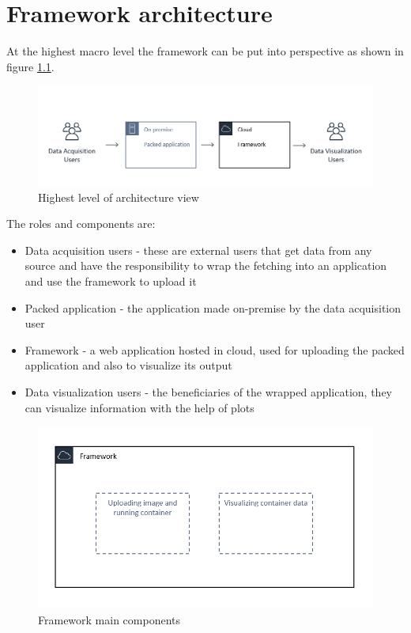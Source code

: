 \chapter{Framework architecture}
\label{chap:03}

At the highest macro level the framework can be put into perspective as shown in figure \ref{fig:architecture1}. 


\begin{figure}[h]
	\centering
	\includegraphics[width=1\linewidth]{./images/architecture/highest_lvl.png}
	\caption{Highest level of architecture view}
	\label{fig:architecture1}
\end{figure}

The roles and components are:
\begin{itemize}
	\item Data acquisition users -  these are external users that get data from any source and have the responsibility to wrap the fetching into an application and use the framework to upload it
	\item Packed application - the application made on-premise by the data acquisition user
	\item Framework - a web application hosted in cloud, used for uploading the packed application and also to visualize its output
	\item Data visualization users - the beneficiaries of the wrapped application, they can visualize information with the help of plots
\end{itemize}

\begin{figure}[h]
	\centering
	\includegraphics[width=1\linewidth]{./images/architecture/framework.png}
	\caption{Framework main components}
	\label{fig:architecture2}
\end{figure}

